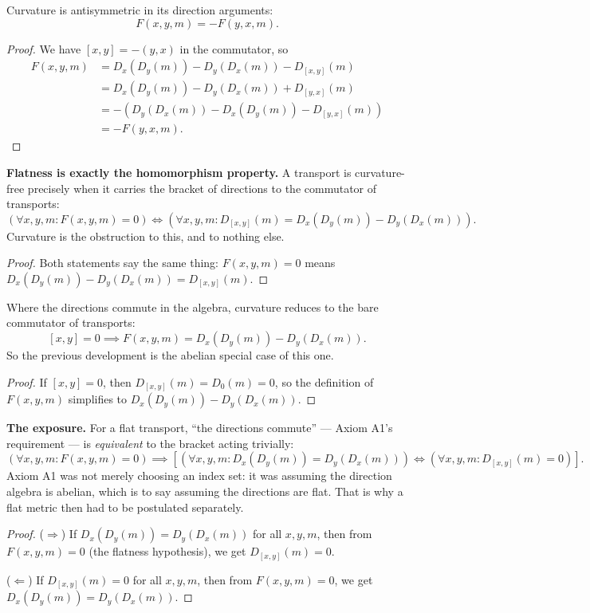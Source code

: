 \begin{theorem}
Curvature is antisymmetric in its direction arguments:
\[
F(x, y, m) = -F(y, x, m).
\]
\begin{proof}
We have $[x,y] = -(y,x)$ in the commutator, so
\begin{align*}
F(x, y, m) &= D_x(D_y(m)) - D_y(D_x(m)) - D_{[x,y]}(m)\\
&= D_x(D_y(m)) - D_y(D_x(m)) + D_{[y,x]}(m)\\
&= -(D_y(D_x(m)) - D_x(D_y(m)) - D_{[y,x]}(m))\\
&= -F(y, x, m).
\end{align*}
\end{proof}
\end{theorem}

\begin{theorem}
\textbf{Flatness is exactly the homomorphism property.} A transport is curvature-free precisely when it carries the bracket of directions to the commutator of transports:
\[
(\forall x, y, m : F(x, y, m) = 0) \iff (\forall x, y, m : D_{[x,y]}(m) = D_x(D_y(m)) - D_y(D_x(m))).
\]
Curvature is the obstruction to this, and to nothing else.
\begin{proof}
Both statements say the same thing: $F(x, y, m) = 0$ means $D_x(D_y(m)) - D_y(D_x(m)) = D_{[x,y]}(m)$.
\end{proof}
\end{theorem}

\begin{theorem}
Where the directions commute in the algebra, curvature reduces to the bare commutator of transports:
\[
[x, y] = 0 \implies F(x, y, m) = D_x(D_y(m)) - D_y(D_x(m)).
\]
So the previous development is the abelian special case of this one.
\begin{proof}
If $[x, y] = 0$, then $D_{[x,y]}(m) = D_0(m) = 0$, so the definition of $F(x, y, m)$ simplifies to $D_x(D_y(m)) - D_y(D_x(m))$.
\end{proof}
\end{theorem}

\begin{theorem}
\textbf{The exposure.} For a flat transport, ``the directions commute'' — Axiom A1's requirement — is \emph{equivalent} to the bracket acting trivially:
\[
(\forall x, y, m : F(x, y, m) = 0) \implies [(\forall x, y, m : D_x(D_y(m)) = D_y(D_x(m))) \iff (\forall x, y, m : D_{[x,y]}(m) = 0)].
\]
Axiom A1 was not merely choosing an index set: it was assuming the direction algebra is abelian, which is to say assuming the directions are flat. That is why a flat metric then had to be postulated separately.
\begin{proof}
($\Rightarrow$) If $D_x(D_y(m)) = D_y(D_x(m))$ for all $x, y, m$, then from $F(x, y, m) = 0$ (the flatness hypothesis), we get $D_{[x,y]}(m) = 0$.

($\Leftarrow$) If $D_{[x,y]}(m) = 0$ for all $x, y, m$, then from $F(x, y, m) = 0$, we get $D_x(D_y(m)) = D_y(D_x(m))$.
\end{proof}
\end{theorem}

